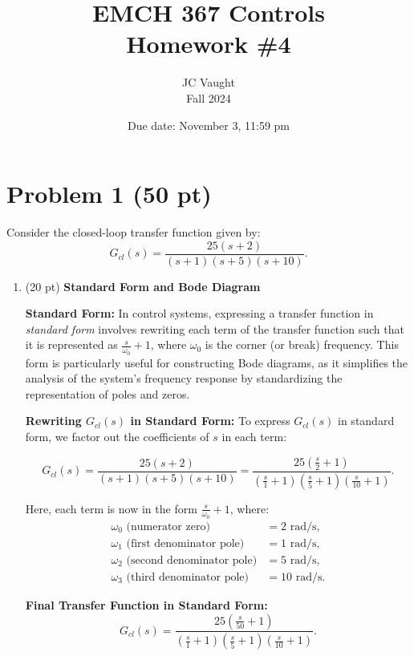 \documentclass{article}
\title{EMCH 367 Controls \\ Homework \#4}
\author{JC Vaught \\ Fall 2024}
\date{Due date: November 3, 11:59 pm}
\begin{document}
\maketitle

\section*{Problem 1 (50 pt)}
Consider the closed-loop transfer function given by:
\[
G_{cl}(s) = \frac{25(s + 2)}{(s + 1)(s + 5)(s + 10)}.
\]

\begin{enumerate}
    \item[(a)] (20 pt) \textbf{Standard Form and Bode Diagram}

    \textbf{Standard Form:}  
    In control systems, expressing a transfer function in \textit{standard form} involves rewriting each term of the transfer function such that it is represented as \(\frac{s}{\omega_0} + 1\), where \(\omega_0\) is the corner (or break) frequency. This form is particularly useful for constructing Bode diagrams, as it simplifies the analysis of the system's frequency response by standardizing the representation of poles and zeros.

    \textbf{Rewriting \( G_{cl}(s) \) in Standard Form:}  
    To express \( G_{cl}(s) \) in standard form, we factor out the coefficients of \( s \) in each term:

    \[
    G_{cl}(s) = \frac{25(s + 2)}{(s + 1)(s + 5)(s + 10)} = \frac{25\left(\frac{s}{2} + 1\right)}{\left(\frac{s}{1} + 1\right)\left(\frac{s}{5} + 1\right)\left(\frac{s}{10} + 1\right)}.
    \]

    Here, each term is now in the form \(\frac{s}{\omega_0} + 1\), where:
    \begin{align*}
        \omega_0 \text{ (numerator zero)} &= 2 \text{ rad/s}, \\
        \omega_1 \text{ (first denominator pole)} &= 1 \text{ rad/s}, \\
        \omega_2 \text{ (second denominator pole)} &= 5 \text{ rad/s}, \\
        \omega_3 \text{ (third denominator pole)} &= 10 \text{ rad/s}.
    \end{align*}

    \textbf{Final Transfer Function in Standard Form:}
    \[
    G_{cl}(s) = \frac{25\left(\frac{s}{50} + 1\right)}{\left(\frac{s}{1} + 1\right)\left(\frac{s}{5} + 1\right)\left(\frac{s}{10} + 1\right)}.
    \]
    
\newpage

\end{enumerate}
\end{document}
